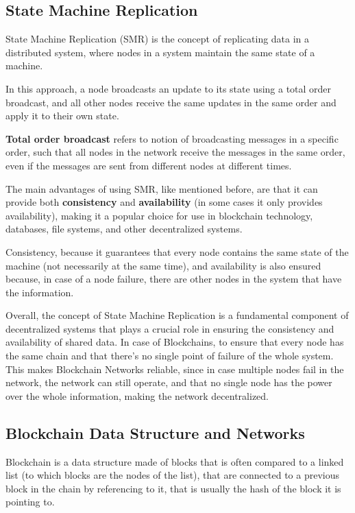 \subsection*{\textbf{State Machine Replication}}
State Machine Replication (SMR) is the concept of replicating data in a distributed system, where nodes in a system maintain the same state of a machine.

In this approach, a node broadcasts an update to its state using a total order broadcast, and all other nodes receive the same updates in the same order and apply it to their own state.

\textbf{Total order broadcast} refers to notion of broadcasting messages in a specific order, such that all nodes in the network receive the messages in the same order, even if the messages are sent from different nodes at different times.

The main advantages of using SMR, like mentioned before, are that it can provide both \textbf{consistency} and \textbf{availability} (in some cases it only provides availability), making it a popular choice for use in blockchain technology, databases, file systems, and other decentralized systems.

Consistency, because it guarantees that every node contains the same state of the machine (not necessarily at the same time), and availability is also ensured because, in case of a node failure, there are other nodes in the system that have the information.

Overall, the concept of State Machine Replication is a fundamental component of decentralized systems that plays a crucial role in ensuring the consistency and availability of shared data. In case of Blockchains, to ensure that every node has the same chain and that there's no single point of failure of the whole system. This makes Blockchain Networks reliable, since in case multiple nodes fail in the network, the network can still operate, and that no single node has the power over the whole information, making the network decentralized. 


\subsection*{\textbf{Blockchain Data Structure and Networks}}
Blockchain is a data structure made of blocks that is often compared to a linked list (to which blocks are the nodes of the list), that are connected to a previous block in the chain by referencing to it, that is usually the hash of the block it is pointing to.

